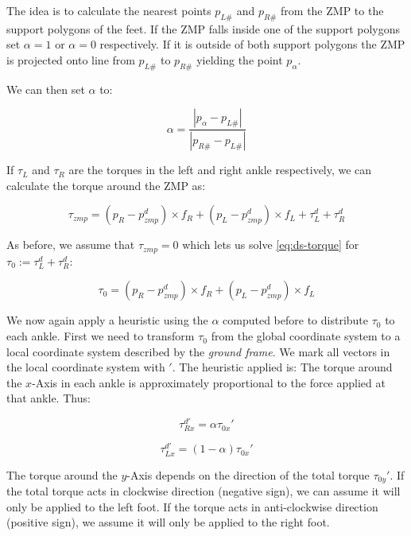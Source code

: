 \documentclass[english,ngerman]{KITreprt}
\begin{document}
The idea is to calculate the nearest points $p_{L\#}$ and $p_{R\#}$ from
the ZMP to the support polygons of the feet. If the ZMP falls inside one
of the support polygons set $\alpha = 1$ or $\alpha = 0$ respectively.
If it is outside of both support polygons the ZMP is projected onto line
from $p_{L\#}$ to $p_{R\#}$ yielding the point $p_{\alpha}$.

We can then set $\alpha$ to:

\begin{equation}
\alpha = \frac{|p_{\alpha} - p_{L\#}|}{|p_{R\#} - p_{L\#}|}
\end{equation}

If $\tau_L$ and $\tau_R$ are the torques in the left and right ankle
respectively, we can calculate the torque around the ZMP as:

\begin{equation} \label{eq:ds-torque}
\tau_{zmp} = (p_R - p^d_{zmp}) \times f_R + (p_L - p^d_{zmp}) \times f_L + \tau^d_L + \tau^d_R
\end{equation}

As before, we assume that $\tau_{zmp} = 0$ which lets us solve
\ref{eq:ds-torque} for $\tau_0 := \tau^d_L + \tau^d_R$:

\begin{equation} \label{eq:tau0-torque}
\tau_0 = (p_R - p^d_{zmp}) \times f_R + (p_L - p^d_{zmp}) \times f_L
\end{equation}

We now again apply a heuristic using the $\alpha$ computed before to
distribute $\tau_0$ to each ankle. First we need to transform $\tau_0$
from the global coordinate system to a local coordinate system described
by the \emph{ground frame}. We mark all vectors in the local coordinate
system with $'$. The heuristic applied is: The torque around the
$x$-Axis in each ankle is approximately proportional to the force
applied at that ankle. Thus:

\begin{equation} \label{eq:torque-right-x}
\tau^{d'}_{Rx} = \alpha \tau_{0x}'
\end{equation}

\begin{equation} \label{eq:torque-left-x}
\tau^{d'}_{Lx} = (1-\alpha) \tau_{0x}'
\end{equation}

The torque around the $y$-Axis depends on the direction of the total
torque $\tau_{0y}'$. If the total torque acts in clockwise direction
(negative sign), we can assume it will only be applied to the left foot.
If the torque acts in anti-clockwise direction (positive sign), we
assume it will only be applied to the right foot.
\end{document}
